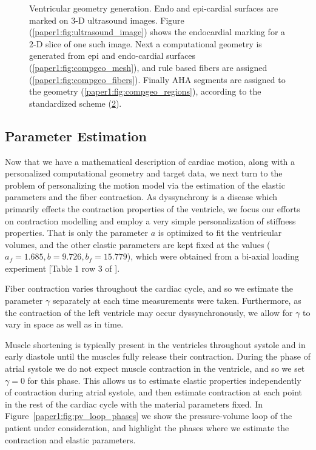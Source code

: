 \begin{figure}[htbp]
\begin{subfigure}[t]{0.35\textwidth}
    \caption{\label{paper1:fig:bullseye}}
  \end{subfigure}
\caption{Ventricular geometry generation. Endo and epi-cardial surfaces 
are marked on 3-D ultrasound images. Figure (\ref{paper1:fig:ultrasound_image}) shows the endocardial 
marking for a 2-D slice of one such image. Next a computational geometry is generated
from epi and endo-cardial surfaces (\ref{paper1:fig:compgeo_mesh}), and rule based
fibers are assigned (\ref{paper1:fig:compgeo_fibers}). Finally AHA segments are assigned
to the geometry (\ref{paper1:fig:compgeo_regions}), according to the standardized scheme
(\ref{paper1:fig:bullseye}).}
\end{figure}

\subsection{Parameter Estimation}
\label{paper1:sec:paramest}
Now that we have a mathematical description of cardiac motion, along
with a personalized computational geometry and target data, we next turn to the
problem of personalizing the motion model via the estimation of the
elastic parameters and the fiber contraction. As dyssynchrony is a disease 
which primarily effects the contraction properties of the ventricle,
we focus our efforts on contraction modelling and employ a very simple
personalization of stiffness properties. That is only the parameter $a$
is optimized to fit the ventricular volumes, and the other elastic parameters
are kept fixed at the values ($a_f = 1.685, b = 9.726, b_f = 15.779$),
which were obtained from a bi-axial loading experiment 
[Table 1 row 3 of \cite{Holzapfel2009}].



Fiber contraction varies throughout the cardiac cycle, and so we estimate
the parameter $\gamma$ separately at each time measurements were taken.
Furthermore, as the contraction of the left ventricle may occur dyssynchronously, we
allow for $\gamma$ to vary in space as well as in time.


Muscle shortening is typically present in the ventricles
throughout systole and in early diastole until the muscles fully release
their contraction. During the phase of atrial systole we do not expect
muscle contraction in the ventricle, and so we set $\gamma = 0$ for
this phase. This allows us to estimate elastic properties
independently of contraction during atrial systole, and then estimate
contraction at each point in the rest of the cardiac cycle with the
material parameters fixed. In Figure~\ref{paper1:fig:pv_loop_phases} we show
the pressure-volume loop of the patient under consideration, and
highlight the phases where we estimate the contraction and elastic
parameters.


